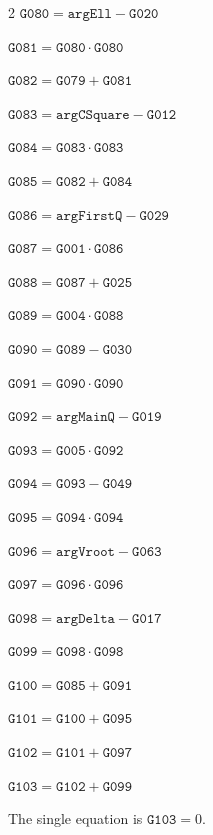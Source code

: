 \documentclass[10pt]{article}
\begin{document}
\begin{multicols}{2}
\noindent $\mathtt{G080}=\mathtt{argEll}-\mathtt{G020}$\par
\noindent $\mathtt{G081}=\mathtt{G080}\cdot \mathtt{G080}$\par
\noindent $\mathtt{G082}=\mathtt{G079}+\mathtt{G081}$\par
\noindent $\mathtt{G083}=\mathtt{argCSquare}-\mathtt{G012}$\par
\noindent $\mathtt{G084}=\mathtt{G083}\cdot \mathtt{G083}$\par
\noindent $\mathtt{G085}=\mathtt{G082}+\mathtt{G084}$\par
\noindent $\mathtt{G086}=\mathtt{argFirstQ}-\mathtt{G029}$\par
\noindent $\mathtt{G087}=\mathtt{G001}\cdot \mathtt{G086}$\par
\noindent $\mathtt{G088}=\mathtt{G087}+\mathtt{G025}$\par
\noindent $\mathtt{G089}=\mathtt{G004}\cdot \mathtt{G088}$\par
\noindent $\mathtt{G090}=\mathtt{G089}-\mathtt{G030}$\par
\noindent $\mathtt{G091}=\mathtt{G090}\cdot \mathtt{G090}$\par
\noindent $\mathtt{G092}=\mathtt{argMainQ}-\mathtt{G019}$\par
\noindent $\mathtt{G093}=\mathtt{G005}\cdot \mathtt{G092}$\par
\noindent $\mathtt{G094}=\mathtt{G093}-\mathtt{G049}$\par
\noindent $\mathtt{G095}=\mathtt{G094}\cdot \mathtt{G094}$\par
\noindent $\mathtt{G096}=\mathtt{argVroot}-\mathtt{G063}$\par
\noindent $\mathtt{G097}=\mathtt{G096}\cdot \mathtt{G096}$\par
\noindent $\mathtt{G098}=\mathtt{argDelta}-\mathtt{G017}$\par
\noindent $\mathtt{G099}=\mathtt{G098}\cdot \mathtt{G098}$\par
\noindent $\mathtt{G100}=\mathtt{G085}+\mathtt{G091}$\par
\noindent $\mathtt{G101}=\mathtt{G100}+\mathtt{G095}$\par
\noindent $\mathtt{G102}=\mathtt{G101}+\mathtt{G097}$\par
\noindent $\mathtt{G103}=\mathtt{G102}+\mathtt{G099}$\par
\end{multicols}
\noindent The single equation is $\boxed{\mathtt{G103}=0}$.
\par\medskip
\end{document}
